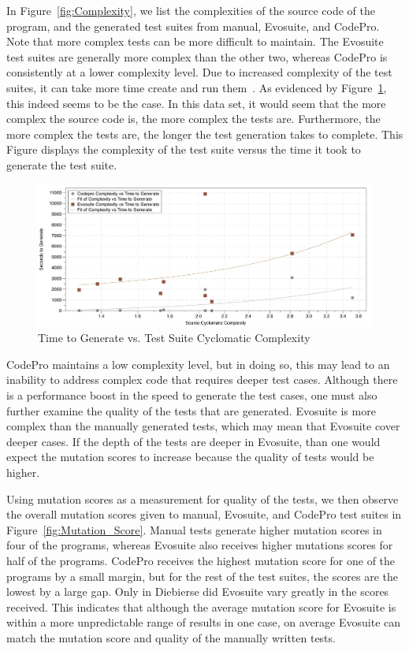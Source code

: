 In Figure~\ref{fig:Complexity}, we list the complexities of the source code of the program, and the generated test suites from manual, Evosuite, and CodePro. Note that more complex tests can be more difficult to maintain. The Evosuite test suites are generally more complex than the other two, whereas CodePro is consistently at a lower complexity level. Due to increased complexity of the test suites, it can take more time create and run them~\cite{alspaugh:2007}. As evidenced by Figure~\ref{fig:Time_Complexity}, this indeed seems to be the case. In this data set, it would seem that the more complex the source code is, the more complex the tests are. Furthermore, the more complex the tests are, the longer the test generation takes to complete. This Figure displays the complexity of the test suite versus the time it took to generate the test suite. 

\begin{figure}[!t]
\centering
  \includegraphics[width=\textwidth]{Time_Complexity}
    \caption{Time to Generate vs. Test Suite Cyclomatic Complexity}
  \label{fig:Time_Complexity}
\end{figure}


CodePro maintains a low complexity level, but in doing so, this may lead to an inability to address complex code that requires deeper test cases. Although there is a performance boost in the speed to generate the test cases, one must also further examine the quality of the tests that are generated. Evosuite is more complex than the manually generated tests, which may mean that Evosuite cover deeper cases. If the depth of the tests are deeper in Evosuite, than one would expect the mutation scores to increase because the quality of tests would be higher. 

Using mutation scores as a measurement for quality of the tests, we then observe the overall mutation scores given to manual, Evosuite, and CodePro test suites in Figure~\ref{fig:Mutation_Score}. Manual tests generate higher mutation scores in four of the programs, whereas Evosuite also receives higher mutations scores for half of the programs. CodePro receives the highest mutation score for one of the programs by a small margin, but for the rest of the test suites, the scores are the lowest by a large gap. Only in Diebierse did Evosuite vary greatly in the scores received. This indicates that although the average mutation score for Evosuite is within a more unpredictable range of results in one case, on average Evosuite can match the mutation score and quality of the manually written tests.

